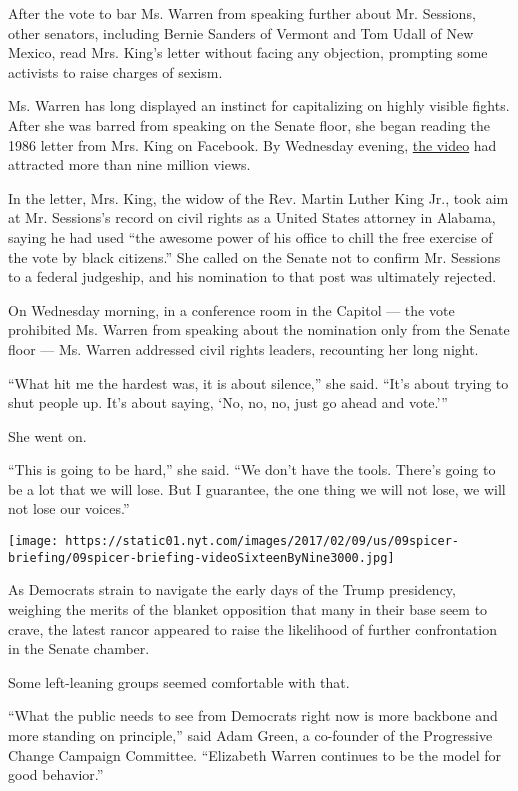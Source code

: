 After the vote to bar Ms. Warren from speaking further about Mr.
Sessions, other senators, including Bernie Sanders of Vermont and Tom
Udall of New Mexico, read Mrs. King's letter without facing any
objection, prompting some activists to raise charges of sexism.

Ms. Warren has long displayed an instinct for capitalizing on highly
visible fights. After she was barred from speaking on the Senate floor,
she began reading the 1986 letter from Mrs. King on Facebook. By
Wednesday evening,
\href{https://www.facebook.com/senatorelizabethwarren/videos/724337794395383/}{the
video} had attracted more than nine million views.

In the letter, Mrs. King, the widow of the Rev. Martin Luther King Jr.,
took aim at Mr. Sessions's record on civil rights as a United States
attorney in Alabama, saying he had used ``the awesome power of his
office to chill the free exercise of the vote by black citizens.'' She
called on the Senate not to confirm Mr. Sessions to a federal judgeship,
and his nomination to that post was ultimately rejected.

On Wednesday morning, in a conference room in the Capitol --- the vote
prohibited Ms. Warren from speaking about the nomination only from the
Senate floor --- Ms. Warren addressed civil rights leaders, recounting
her long night.

``What hit me the hardest was, it is about silence,'' she said. ``It's
about trying to shut people up. It's about saying, `No, no, no, just go
ahead and vote.'''

She went on.

``This is going to be hard,'' she said. ``We don't have the tools.
There's going to be a lot that we will lose. But I guarantee, the one
thing we will not lose, we will not lose our voices.''

\texttt{[image: https://static01.nyt.com/images/2017/02/09/us/09spicer-briefing/09spicer-briefing-videoSixteenByNine3000.jpg]}

As Democrats strain to navigate the early days of the Trump presidency,
weighing the merits of the blanket opposition that many in their base
seem to crave, the latest rancor appeared to raise the likelihood of
further confrontation in the Senate chamber.

Some left-leaning groups seemed comfortable with that.

``What the public needs to see from Democrats right now is more backbone
and more standing on principle,'' said Adam Green, a co-founder of the
Progressive Change Campaign Committee. ``Elizabeth Warren continues to
be the model for good behavior.''


